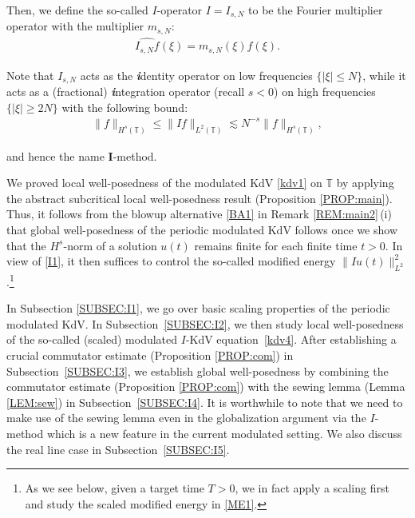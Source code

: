 \documentclass[letterpaper, 11pt,  reqno]{amsart}
\newcommand{\1}{\hspace{0.5mm}\text{I}\hspace{0.5mm}}
\newcommand{\noi}{\noindent}
\newcommand{\T}{\mathbb{T}}
\newcommand{\ft}{\widehat}
\newcommand{\bi}{\bfseries\itshape}
\newcommand{\les}{\lesssim}
\numberwithin{equation}{section}
\numberwithin{theorem}{section}
\begin{document}
\noi
Then, we define the so-called $I$-operator $I = I_{s, N}$
to be the Fourier multiplier operator with the multiplier $m_{s, N}$:
\begin{align}
\ft{I_{s, N}f}(\xi)=m_{s, N}(\xi)\ft{f}(\xi).
\label{Ix2}
\end{align}


\noi
Note that 
$I_{s, N}$ acts as the {\bi i}\hspace{0.25mm}dentity operator on low frequencies $\{ |\xi| \leq N\}$, 
while it acts as a (fractional)  
{{\bi i}\hspace{0.25mm}\nolinebreak ntegration}   operator 
(recall  $s < 0$)
 on high frequencies $\{ |\xi| \geq 2N\}$
 with the following bound:
\begin{align}
\| f \|_{H^s (\T) } \leq\| I f \|_{L^2(\T)}
\les N^{-s} \| f \|_{H^s(\T)}, 
\label{I1}
\end{align}

\noi
 and hence the name $\pmb{I}$-method.



We proved local well-posedness
of 
the modulated KdV \eqref{kdv1} on $\T$
by applying the abstract subcritical  local well-posedness
result (Proposition \ref{PROP:main}).
Thus, it follows from the blowup alternative \eqref{BA1}
in Remark \ref{REM:main2}\,(i)
that 
global well-posedness of the periodic modulated KdV follows
once we show that the $H^s$-norm 
of a solution $u(t)$ remains finite 
for each finite time $t > 0$.
In view of \eqref{I1}, 
it then suffices to control the so-called
modified energy $\| Iu(t)\|_{L^2}^2$.\footnote{As we see below, given a target time $T> 0$, 
we in fact apply a scaling first and study the scaled modified energy in \eqref{ME1}.}


In Subsection \ref{SUBSEC:I1}, 
we go over basic scaling properties
of the periodic modulated KdV.
In Subsection~\ref{SUBSEC:I2}, 
we then study  local well-posedness
of the so-called (scaled) modulated $I$-KdV equation~\eqref{kdv4}.
After establishing a crucial commutator estimate
(Proposition \ref{PROP:com}) in Subsection~\ref{SUBSEC:I3}, 
we establish global well-posedness
by combining the commutator estimate (Proposition \ref{PROP:com})
with the sewing lemma (Lemma \ref{LEM:sew})
in Subsection~\ref{SUBSEC:I4}.
It is worthwhile to note that we need to make use
of the sewing lemma even in the globalization argument via the $I$-method
which is a new feature in the current modulated setting.
We also discuss the real line case in Subsection~\ref{SUBSEC:I5}.
\end{document}
